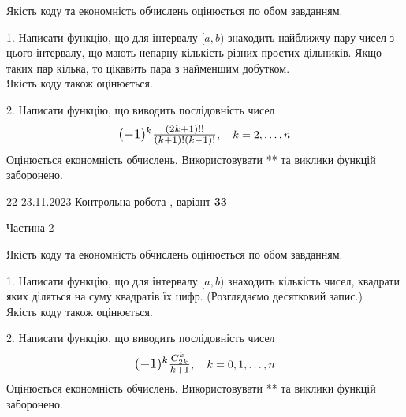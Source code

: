 \documentclass[12pt, ukrainian]{article}
\begin{document}
{{{{
\begin {Large}
Якість коду та економність обчислень оцінюється по обом завданням.

\vspace{5mm}

1. Написати функцію, що для інтервалу $[a, b)$ знаходить найближчу пару чисел з цього інтервалу, що мають непарну кількість різних простих дільників. Якщо таких пар кілька, то цікавить пара з найменшим добутком.\\	Якість коду також оцінюється. 



\vspace{10mm}



2. 
Написати функцію, що виводить послідовність чисел
$$\scalebox{1.2}{$(-1)^{k}\frac{(2k+1)!!}{(k+1)!(k-1)!}$}, \quad k=2,\ldots,n$$
Оцінюється економність обчислень. Використовувати ** та виклики функцій заборонено.

\end{Large}\newpage




\begin {Huge}
{{22-23.11.2023 Контрольна робота , варіант  \No \textbf { 33 }\par}}

\begin{center}Частина 2
\end{center}
\vspace{10mm}
\end {Huge}

{
\begin {Large}
Якість коду та економність обчислень оцінюється по обом завданням.

\vspace{5mm}

1. Написати функцію, що для інтервалу $[a, b)$ знаходить кількість чисел, квадрати яких діляться на суму квадратів їх цифр. (Розглядаємо десятковий запис.)\\	Якість коду також оцінюється. 



\vspace{10mm}



2. 
Написати функцію, що виводить послідовність чисел
$$\scalebox{1.2}{$(-1)^{k}\frac{C_{2k}^k}{k+1}$}, \quad k=0,1,\ldots,n$$
Оцінюється економність обчислень. Використовувати ** та виклики функцій заборонено.


\end{Large}}}}}}
\end{document}

